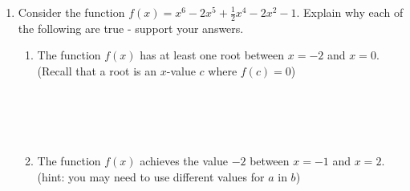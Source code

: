\documentclass[12pt]{report}
\begin{document}
\begin{enumerate}[resume*]
\item Consider the function $f(x)=x^{6}-2x^{5}+\frac{1}{2}x^{4}-2x^{2}-1$. Explain why each of the following are true - support your answers.\\
\begin{enumerate}[label=\alph*.]
    \item The function $f(x)$ has at least one root between $x=-2$ and $x=0$. (Recall that a root is an $x$-value $c$ where $f(c)=0$)\\\\\\\\\\
    \item The function $f(x)$ achieves the value $-2$ between $x=-1$ and $x=2$. (hint: you may need to use different values for $a$ in $b$)\\\\\\\\\\\\\\\\
\end{enumerate}
\end{enumerate}
\end{document}
